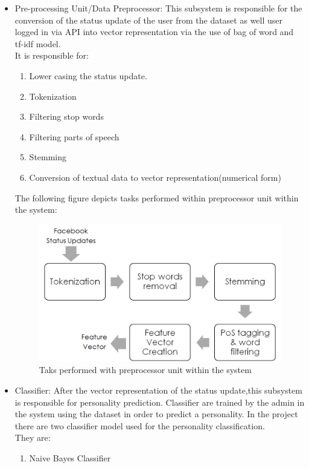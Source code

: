 \begin{itemize}
	\item Pre-processing Unit/Data Preprocessor: This subsystem is responsible for the conversion of the status update of the user from the dataset \cite{dataset} as well user logged in via API \cite{api} into vector representation via the use of bag of word and tf-idf model.\\
It is responsible for:
		\begin{enumerate}
			\item Lower casing the status update.
			\item Tokenization
			\item Filtering stop words
			\item Filtering parts of speech
			\item Stemming
			\item Conversion of textual data to vector representation(numerical form)
		\end{enumerate}
The following figure depicts tasks performed within preprocessor unit within the system:
\begin{figure}[!ht]
\centering
\includegraphics[width = 16 cm]{fig/preprocessing.png}
\caption{Taks performed with preprocessor unit within the system}
\label{fig:project}
\end{figure}
	\item Classifier: After the vector representation of the status update,this subsystem is responsible for personality prediction. Classifier are trained by the admin in the system using the dataset \cite{dataset} in order to predict a personality. In the project there are two classifier model used for the personality classification.\\
They are:
\begin{enumerate}
	\item Naive Bayes Classifier

\end{enumerate}
\end{itemize}
